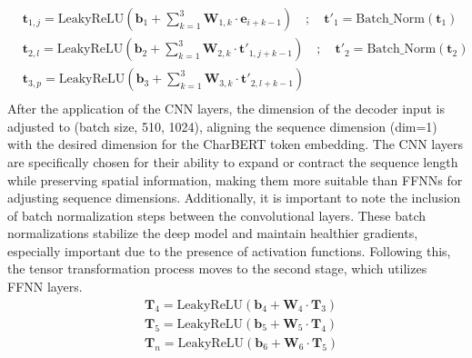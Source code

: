 \begin{equation} \label{eq:3_tensor_transform_cnn}
    \begin{split}
        &\mathbf{t}_{1, j} = \text{LeakyReLU}(\mathbf{b}_1 + \sum_{k=1}^{3}\mathbf{W}_{1,k}\cdot \mathbf{e}_{i+k-1})\quad;\quad \mathbf{t}'_1 = \text{Batch\_Norm}(\mathbf{t}_1)\\
        &\mathbf{t}_{2, l} = \text{LeakyReLU}(\mathbf{b}_2 + \sum_{k=1}^{3}\mathbf{W}_{2,k}\cdot \mathbf{t}'_{1,j+k-1})\quad;\quad \mathbf{t}'_2 = \text{Batch\_Norm}(\mathbf{t}_2)\\
        &\mathbf{t}_{3, p} = \text{LeakyReLU}(\mathbf{b}_3 + \sum_{k=1}^{3}\mathbf{W}_{3,k}\cdot \mathbf{t}'_{2,l+k-1})\quad\\
    \end{split}
\end{equation}
After the application of the CNN layers, the dimension of the decoder input is adjusted to (batch size, 510, 1024), aligning the sequence dimension (dim=1) with the desired dimension for the CharBERT token embedding. The CNN layers are specifically chosen for their ability to expand or contract the sequence length while preserving spatial information, making them more suitable than FFNNs for adjusting sequence dimensions. Additionally, it is important to note the inclusion of batch normalization steps between the convolutional layers. These batch normalizations stabilize the deep model and maintain healthier gradients, especially important due to the presence of activation functions. Following this, the tensor transformation process moves to the second stage, which utilizes FFNN layers.
\begin{equation} \label{eq:3_tensor_transform_ffnn}
    \begin{split}
        &\mathbf{T}_{4} = \text{LeakyReLU}(\mathbf{b}_4 + \mathbf{W}_4\cdot \mathbf{T}_{3})\\
        &\mathbf{T}_{5} = \text{LeakyReLU}(\mathbf{b}_5 + \mathbf{W}_5\cdot \mathbf{T}_{4})\\
        &\mathbf{T}_{n} = \text{LeakyReLU}(\mathbf{b}_6 + \mathbf{W}_6\cdot \mathbf{T}_{5})\\
    \end{split}
\end{equation}

